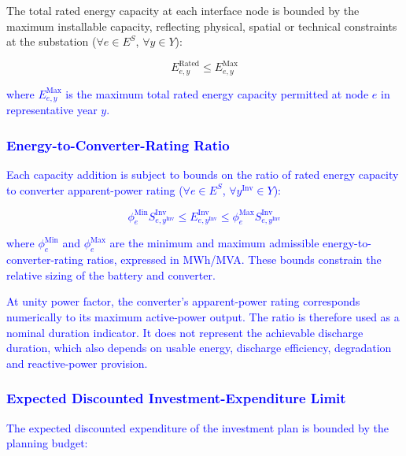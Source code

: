 \documentclass[preprint,12pt]{elsarticle}
\begin{document}
The total rated energy capacity at each interface node is bounded by the maximum installable capacity, reflecting physical, spatial or technical constraints at the substation ($\forall e\in E^S$, $\forall y\in Y$):

\begin{equation}
    E_{e,y}^{\text{Rated}} \leq E^{\text{Max}}_{e,y}
\end{equation}

\noindent
\textcolor{blue}{
    where $E^{\text{Max}}_{e,y}$ is the maximum total rated energy capacity permitted at node $e$ in representative year $y$.
}

\subsubsection{\textcolor{blue}{Energy-to-Converter-Rating Ratio}}

\textcolor{blue}{
    Each capacity addition is subject to bounds on the ratio of rated energy capacity to converter apparent-power rating ($\forall e\in E^S$, $\forall y^{\text{Inv}}\in Y$):
}

\textcolor{blue}{
    \begin{equation}
        \phi^{\text{Min}}_e S^{\text{Inv}}_{e,y^{\text{Inv}}} \leq 
        E^{\text{Inv}}_{e,y^{\text{Inv}}} \leq 
        \phi^{\text{Max}}_e S^{\text{Inv}}_{e,y^{\text{Inv}}}
        \label{eq:master_duration}
    \end{equation}
}

\noindent
\textcolor{blue}{
    where $\phi^{\text{Min}}_e$ and $\phi^{\text{Max}}_e$ are the minimum and maximum admissible energy-to-converter-rating ratios, expressed in MWh/MVA. These bounds constrain the relative sizing of the battery and converter.
}

\textcolor{blue}{
    At unity power factor, the converter's apparent-power rating corresponds numerically to its maximum active-power output. The ratio is therefore used as a nominal duration indicator. It does not represent the achievable discharge duration, which also depends on usable energy, discharge efficiency, degradation and reactive-power provision.
}

\subsubsection{\textcolor{blue}{Expected Discounted Investment-Expenditure Limit}}

\textcolor{blue}{
    The expected discounted expenditure of the investment plan is bounded by the planning budget:
}
\end{document}
